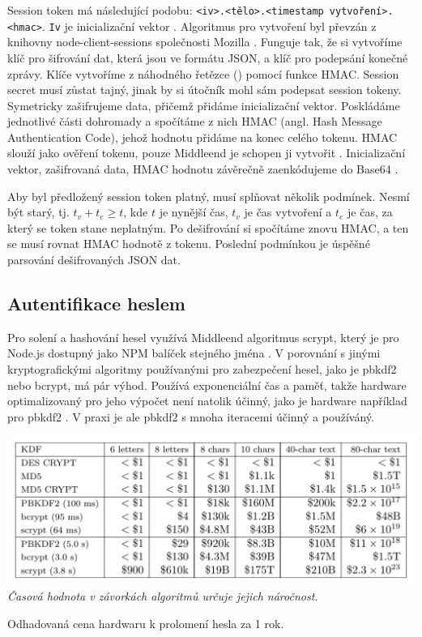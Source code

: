 Session token má následující podobu: \newline
\verb|<iv>.<tělo>.<timestamp vytvoření>.<hmac>|. \verb|Iv| je inicializační vektor \citep[viz][]{TechopediaIV}.
Algoritmus pro vytvoření byl převzán z
knihovny node-client-sessions společnosti Mozilla \citep[viz][]{MozillaSession}.
Funguje tak, že si vytvoříme klíč pro šifrování dat, která jsou ve formátu JSON,
a klíč pro podepsání konečné zprávy. Klíče vytvoříme z náhodného řetězce () pomocí funkce HMAC.
Session secret musí zůstat tajný, jinak by si útočník mohl sám podepsat session tokeny.
Symetricky zašifrujeme data, přičemž přidáme inicializační vektor.
Poskládáme jednotlivé části dohromady a spočítáme z nich HMAC
(angl. Hash Message Authentication Code), jehož hodnotu přidáme na konec celého tokenu.
HMAC slouží jako ověření tokenu, pouze Middleend je schopen ji vytvořit \citep[viz][]{SecSA}.
Inicializační vektor, zašifrovaná data, HMAC hodnotu závěrečně zaenkódujeme do Base64 \citep[viz][]{RFC4649}.

Aby byl předložený session token platný, musí splňovat několik podmínek.
Nesmí být starý, tj. $t_v + t_e \geq t$,
kde $t$ je nynější čas, $t_v$ je čas vytvoření a $t_e$ je čas, za který se token stane neplatným.
Po dešifrování si spočítáme znovu HMAC, a ten se musí rovnat HMAC hodnotě z tokenu.
Poslední podmínkou je úspěšné parsování dešifrovaných JSON dat.

\subsection{Autentifikace heslem}

Pro solení a hashování hesel využívá Middleend algoritmus scrypt, který
je pro Node.js dostupný jako NPM balíček stejného jména \citep[viz][]{NodeScrypt}.
V porovnání s jinými kryptografickými algoritmy používanými pro zabezpečení hesel,
jako je pbkdf2 nebo bcrypt, má pár výhod.
Používá exponenciální čas a paměť, takže hardware optimalizovaný pro jeho výpočet
není natolik účinný, jako je hardware například pro pbkdf2 \citep[viz][]{MediumScrypt}.
V praxi je ale pbkdf2 s mnoha iteracemi účinný a používáný.

\begin{table}[htb]\centering
\includegraphics[width=140mm]{../img/crypto-funcs}
\textit{Časová hodnota v závorkách algoritmů určuje jejich náročnost.}
\caption{Odhadovaná cena hardwaru k prolomení hesla za 1 rok. \citep[viz][]{ScryptTable}}
\label{passwordCrackingCost}
\end{table}

